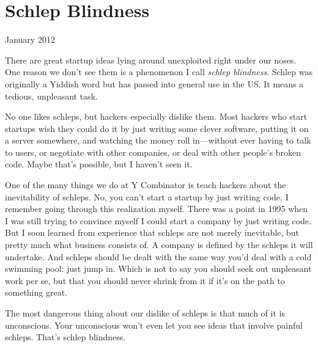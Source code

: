 \chapter{Schlep Blindness}


            
              
                


                  
                    January 2012

There are great startup ideas lying
                    around unexploited right under our noses. One reason we
                    don't see them is a phenomenon I call
                    \emph{schlep blindness}. Schlep was originally a Yiddish
                    word but has passed into general use in the US. It means a
                    tedious, unpleasant task.

No one likes schleps,
                    but hackers especially dislike them. Most hackers who start
                    startups wish they could do it by just writing some clever
                    software, putting it on a server somewhere, and watching the
                    money roll in---without ever having to talk to users, or
                    negotiate with other companies, or deal with other people's
                    broken code. Maybe that's possible, but I haven't seen
                    it.

One of the many things we do at Y Combinator
                    is teach hackers about the inevitability of schleps. No, you
                    can't start a startup by just writing code. I remember going
                    through this realization myself. There was a point in 1995
                    when I was still trying to convince myself I could start a
                    company by just writing code. But I soon learned from
                    experience that schleps are not merely inevitable, but
                    pretty much what business consists of. A company is defined
                    by the schleps it will undertake. And schleps should be
                    dealt with the same way you'd deal with a cold swimming
                    pool: just jump in. Which is not to say you should seek out
                    unpleasant work per se, but that you should never shrink
                    from it if it's on the path to something great.

The
                    most dangerous thing about our dislike of schleps is that
                    much of it is unconscious. Your unconscious won't even let
                    you see ideas that involve painful schleps. That's schlep
                    blindness.


